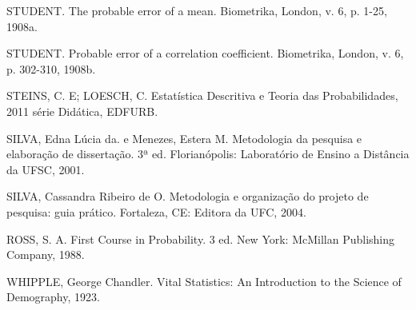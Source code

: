 STUDENT. The probable error of a mean. Biometrika, London, v. 6, p. 1-25, 1908a.\vskip0.3cm

STUDENT. Probable error of a correlation coefficient. Biometrika, London, v. 6, p. 302-310, 1908b.\vskip0.3cm

STEINS, C. E; LOESCH, C. Estatística Descritiva e Teoria das Probabilidades, 2011 série Didática, EDFURB.\vskip0.3cm

SILVA, Edna Lúcia da. e Menezes, Estera M. Metodologia da pesquisa e elaboração de dissertação. 3ª ed. Florianópolis: Laboratório de Ensino a Distância da UFSC, 2001.\vskip0.3cm

SILVA, Cassandra Ribeiro de O. Metodologia e organização do projeto de pesquisa: guia prático. Fortaleza, CE: Editora da UFC, 2004.\vskip0.3cm

ROSS, S. A. First Course in Probability. 3 ed. New York:
McMillan Publishing Company, 1988.\vskip0.3cm


WHIPPLE, George Chandler. Vital Statistics: An Introduction to the Science of Demography, 1923. 







